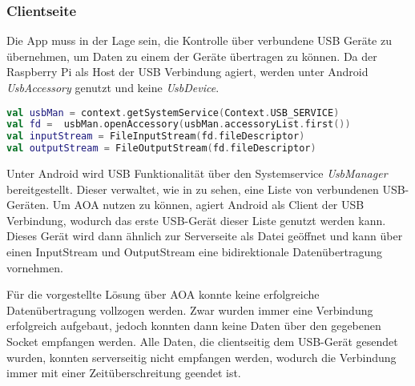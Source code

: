     \subsubsection{Clientseite}
        Die App muss in der Lage sein, die Kontrolle über verbundene USB Geräte zu übernehmen, um Daten zu einem der Geräte übertragen zu können. Da der Raspberry Pi als Host der USB Verbindung agiert, werden unter Android {\it UsbAccessory} genutzt und keine {\it UsbDevice}.
        \begin{lstlisting}[frame=bt, label={lst:usb:client}, language=Kotlin, caption=Verbindungsaufbau über USB (Clientcode in Kotlin)]
val usbMan = context.getSystemService(Context.USB_SERVICE)
val fd =  usbMan.openAccessory(usbMan.accessoryList.first())
val inputStream = FileInputStream(fd.fileDescriptor)
val outputStream = FileOutputStream(fd.fileDescriptor)
        \end{lstlisting}
        Unter Android wird USB Funktionalität über den Systemservice {\it UsbManager} bereitgestellt. Dieser verwaltet, wie in  zu sehen, eine Liste von verbundenen USB-Geräten. Um AOA nutzen zu können, agiert Android als Client der USB Verbindung, wodurch das erste USB-Gerät dieser Liste genutzt werden kann. Dieses Gerät wird dann ähnlich zur Serverseite als Datei geöffnet und kann über einen InputStream und OutputStream eine bidirektionale Datenübertragung vornehmen.

        Für die vorgestellte Lösung über AOA konnte keine erfolgreiche Datenübertragung vollzogen werden. Zwar wurden immer eine Verbindung erfolgreich aufgebaut, jedoch konnten dann keine Daten über den gegebenen Socket empfangen werden. Alle Daten, die clientseitig dem USB-Gerät gesendet wurden, konnten serverseitig nicht empfangen werden, wodurch die Verbindung immer mit einer Zeitüberschreitung geendet ist.
